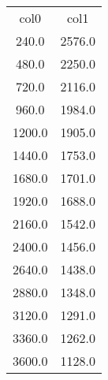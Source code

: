 \begin{table}
\begin{tabular}{cc}
col0 & col1 \\
240.0 & 2576.0 \\
480.0 & 2250.0 \\
720.0 & 2116.0 \\
960.0 & 1984.0 \\
1200.0 & 1905.0 \\
1440.0 & 1753.0 \\
1680.0 & 1701.0 \\
1920.0 & 1688.0 \\
2160.0 & 1542.0 \\
2400.0 & 1456.0 \\
2640.0 & 1438.0 \\
2880.0 & 1348.0 \\
3120.0 & 1291.0 \\
3360.0 & 1262.0 \\
3600.0 & 1128.0 \\
\end{tabular}
\end{table}
